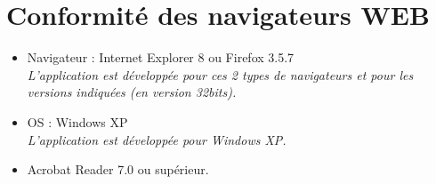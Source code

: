 \documentclass[a4paper]{report}
\begin{document}
\section{Conformité des navigateurs WEB}

\begin{itemize}
	\item Navigateur : Internet Explorer 8 ou Firefox 3.5.7 \\
	\textit{L'application est développée pour ces 2 types de navigateurs et pour les 
	versions indiquées (en version 32bits).}
	\item OS : Windows XP \\
	\textit{L’application est développée pour Windows XP.}
	\item Acrobat Reader 7.0 ou supérieur.
\end{itemize}
\end{document}
